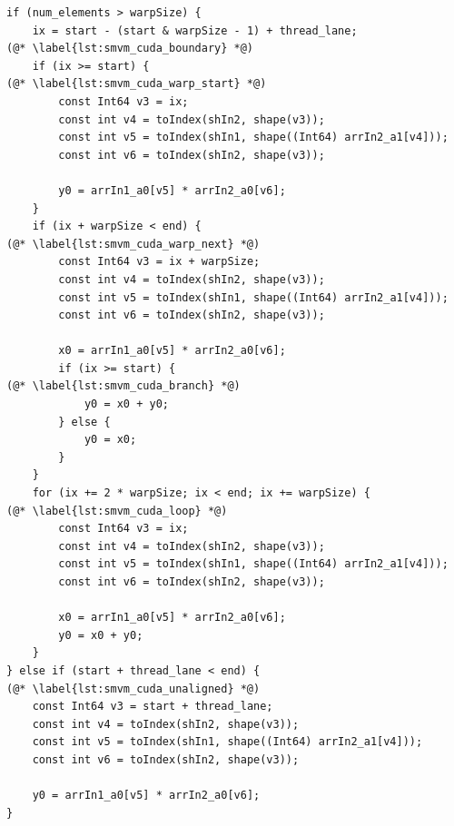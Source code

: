 \begin{lstlisting}[style=cuda
    ,float
    ,firstnumber=44
    ,label=lst:smvm_cuda
    ,caption={Generated CUDA code for sparse-matrix vector multiplication}]
if (num_elements > warpSize) {
    ix = start - (start & warpSize - 1) + thread_lane;                  (@* \label{lst:smvm_cuda_boundary} *@)
    if (ix >= start) {                                                  (@* \label{lst:smvm_cuda_warp_start} *@)
        const Int64 v3 = ix;
        const int v4 = toIndex(shIn2, shape(v3));
        const int v5 = toIndex(shIn1, shape((Int64) arrIn2_a1[v4]));
        const int v6 = toIndex(shIn2, shape(v3));

        y0 = arrIn1_a0[v5] * arrIn2_a0[v6];
    }
    if (ix + warpSize < end) {                                          (@* \label{lst:smvm_cuda_warp_next} *@)
        const Int64 v3 = ix + warpSize;
        const int v4 = toIndex(shIn2, shape(v3));
        const int v5 = toIndex(shIn1, shape((Int64) arrIn2_a1[v4]));
        const int v6 = toIndex(shIn2, shape(v3));

        x0 = arrIn1_a0[v5] * arrIn2_a0[v6];
        if (ix >= start) {                                              (@* \label{lst:smvm_cuda_branch} *@)
            y0 = x0 + y0;
        } else {
            y0 = x0;
        }
    }
    for (ix += 2 * warpSize; ix < end; ix += warpSize) {                (@* \label{lst:smvm_cuda_loop} *@)
        const Int64 v3 = ix;
        const int v4 = toIndex(shIn2, shape(v3));
        const int v5 = toIndex(shIn1, shape((Int64) arrIn2_a1[v4]));
        const int v6 = toIndex(shIn2, shape(v3));

        x0 = arrIn1_a0[v5] * arrIn2_a0[v6];
        y0 = x0 + y0;
    }
} else if (start + thread_lane < end) {                                 (@* \label{lst:smvm_cuda_unaligned} *@)
    const Int64 v3 = start + thread_lane;
    const int v4 = toIndex(shIn2, shape(v3));
    const int v5 = toIndex(shIn1, shape((Int64) arrIn2_a1[v4]));
    const int v6 = toIndex(shIn2, shape(v3));

    y0 = arrIn1_a0[v5] * arrIn2_a0[v6];
}
\end{lstlisting}

